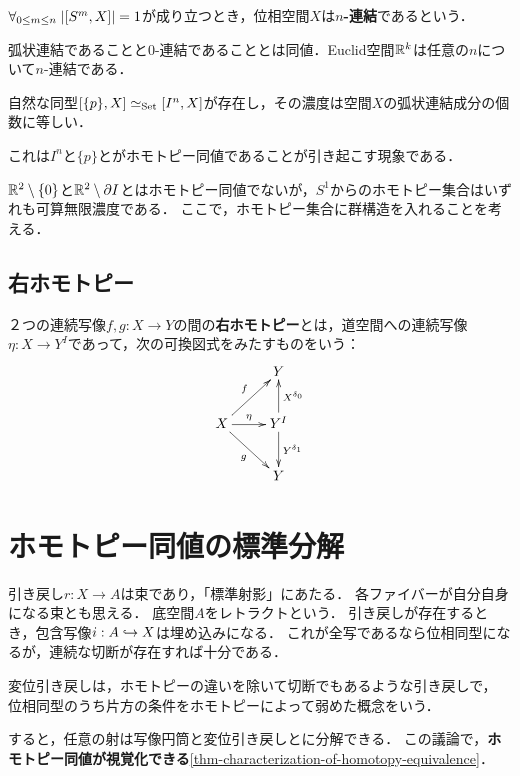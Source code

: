 \documentclass[uplatex,dvipdfmx]{jsreport}
\begin{document}
\begin{definition}
    $\forall_{0\le m\le n}\;\lvert[S^m,X]\rvert=1$が成り立つとき，位相空間$X$は\textbf{$n$-連結}であるという．
\end{definition}
\begin{remarks}
    弧状連結であることと$0$-連結であることとは同値．Euclid空間$\mathbb{R}^k$は任意の$n$について$n$-連結である．
\end{remarks}

\begin{lemma}
    自然な同型$[\{p\},X]\simeq_{\mathrm{Set}}[I^n,X]$が存在し，その濃度は空間$X$の弧状連結成分の個数に等しい．
\end{lemma}
\begin{remarks}
    これは$I^n$と$\{p\}$とがホモトピー同値であることが引き起こす現象である．
\end{remarks}

\begin{discussion}
    $\mathbb{R}^2\setminus\{0\}$と$\mathbb{R}^2\setminus\partial I$とはホモトピー同値でないが，$S^1$からのホモトピー集合はいずれも可算無限濃度である．
    ここで，ホモトピー集合に群構造を入れることを考える．
\end{discussion}

\subsection{右ホモトピー}

\begin{definition}
    ２つの連続写像$f,g:X\to Y$の間の\textbf{右ホモトピー}とは，道空間への連続写像$\eta:X\to Y^I$であって，次の可換図式をみたすものをいう：
    \[\xymatrix{
        &Y\\
        X\ar[ur]^-f\ar[r]^-\eta\ar[dr]_g&Y^I\ar[u]_-{X^{\delta_0}}\ar[d]^-{Y^{\delta_1}}\\
        &Y
    }\]
\end{definition}

\section{ホモトピー同値の標準分解}

\begin{tcolorbox}[colframe=ForestGreen, colback=ForestGreen!10!white,breakable,colbacktitle=ForestGreen!40!white,coltitle=black,fonttitle=\bfseries\sffamily,
title=空間の変位レトラクトとは，全体空間をそこに連続的に縮めることが出来る部分空間である]
    引き戻し$r:X\to A$は束であり，「標準射影」にあたる．
    各ファイバーが自分自身になる束とも思える．
    底空間$A$をレトラクトという．
    引き戻しが存在するとき，包含写像$i:A\hookrightarrow X$は埋め込みになる．
    これが全写であるなら位相同型になるが，連続な切断が存在すれば十分である．

    変位引き戻しは，ホモトピーの違いを除いて切断でもあるような引き戻しで，
    位相同型のうち片方の条件をホモトピーによって弱めた概念をいう．

    すると，任意の射は写像円筒と変位引き戻しとに分解できる．
    この議論で，\textbf{ホモトピー同値が視覚化できる}\ref{thm-characterization-of-homotopy-equivalence}．
\end{tcolorbox}
\end{document}

